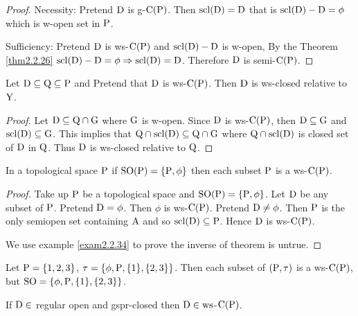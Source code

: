 \begin{proof}
Necessity: Pretend $\mathrm{D}$ is g-$\mathrm{C}(\mathrm{P})$. Then $\mathrm{scl}(\mathrm{D})=\mathrm{D}$ that is $\mathrm{scl}(\mathrm{D})-\mathrm{D}=\phi$ which is w-open set in $\mathrm{P}$.

Sufficiency: Pretend $\mathrm{D}$ is ws-$\mathrm{C}(\mathrm{P})$ and $\mathrm{scl}(\mathrm{D})-\mathrm{D}$ is w-open, By the Theorem \ref{thm2.2.26} $\mathrm{scl}(\mathrm{D})-\mathrm{D}=\phi\Rightarrow \mathrm{scl}(\mathrm{D})=\mathrm{D}$. Therefore $\mathrm{D}$ is semi-$\mathrm{C}(\mathrm{P})$.
\end{proof}

\begin{thm}\label{thm2.2.32}
Let $\mathrm{D}\subseteq \mathrm{Q}\subseteq \mathrm{P}$ and Pretend that $\mathrm{D}$ is ws-$\mathrm{C}(\mathrm{P})$. Then $\mathrm{D}$ is ws-closed relative to $\mathrm{Y}$.
\end{thm}

\begin{proof}
Let $\mathrm{D}\subseteq \mathrm{Q}\cap \mathrm{G}$ where $\mathrm{G}$ is w-open. Since $\mathrm{D}$ is ws-$\mathrm{C}(\mathrm{P})$, then $\mathrm{D}\subseteq \mathrm{G}$ and $\mathrm{scl}(\mathrm{D})\subseteq \mathrm{G}$. This
implies that $\mathrm{Q} \cap \mathrm{scl}(\mathrm{D}) \subseteq \mathrm{Q}\cap \mathrm{G}$ where $\mathrm{Q} \cap \mathrm{scl}(\mathrm{D})$ is closed set of $\mathrm{D}$ in $\mathrm{Q}$. Thus $\mathrm{D}$ is ws-closed
relative to $\mathrm{Q}$.
\end{proof}

\begin{thm}\label{thm2.2.33}
In a topological space $\mathrm{P}$ if $\mathrm{SO}(\mathrm{P}) =\{\mathrm{P}, \phi\}$ then each subset $\mathrm{P}$ is a ws-$\mathrm{C}(\mathrm{P})$.
\end{thm}

\begin{proof}
Take up $\mathrm{P}$ be a topological space and $\mathrm{SO}(\mathrm{P})=\{\mathrm{P}, \phi\}$. Let $\mathrm{D}$ be any subset of $\mathrm{P}$. Pretend $\mathrm{D}=\phi$. Then $\phi$ is ws-$\mathrm{C}(\mathrm{P})$. Pretend $\mathrm{D}\neq\phi$. Then $\mathrm{P}$  is the only semiopen set containing $\mathrm{A}$ and so $\mathrm{scl}(\mathrm{D})\subseteq \mathrm{P}$. Hence $\mathrm{D}$ is ws-$\mathrm{C}(\mathrm{P})$. 

We use example \ref{exam2.2.34} to prove the inverse of theorem is untrue.
\end{proof}

\begin{exm}\label{exam2.2.34}
Let $\mathrm{P}  = \{1, 2, 3\}$, $\tau = \{\phi, \mathrm{P}, \{1\}, \{2, 3\}\}$. Then each subset of $(\mathrm{P},\tau)$ is a ws-$\mathrm{C}(\mathrm{P})$, but $\mathrm{SO}= \{\phi, \mathrm{P}, \{1\}, \{2, 3\}\}$.
\end{exm}

\begin{thm}\label{thm2.2.35}
If $\mathrm{D}\in$ regular open and gspr-closed then $\mathrm{D}\in\mathrm{ws}$-$\mathrm{C}(\mathrm{P})$.
\end{thm}

